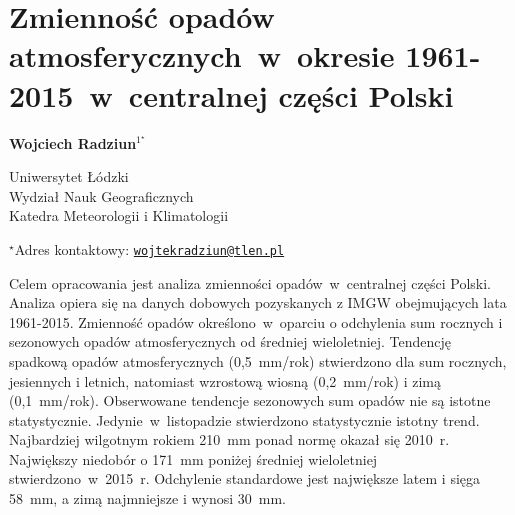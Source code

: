 \documentclass[\main/boa.tex]{subfiles}
\begin{document}
\section{Zmienność opadów atmosferycznych~w~okresie 1961-2015~w~centralnej części Polski}

\begin{center}
  {\bf {} Wojciech Radziun$^{1^\star}$}
\end{center}

\vskip 0.3cm

\begin{affiliations}
\begin{enumerate}
\begin{minipage}{0.915\textwidth}
\centering
\item Uniwersytet Łódzki \\ Wydział Nauk Geograficznych \\ Katedra Meteorologii i Klimatologii\\[-2pt]
\end{minipage}
\end{enumerate}
$^\star$Adres kontaktowy: \href{mailto:wojtekradziun@tlen.pl}{\nolinkurl{wojtekradziun@tlen.pl}}\\
\end{affiliations}

\vskip 0.5cm


\vskip 0.5cm

Celem opracowania jest analiza zmienności opadów~w~centralnej części Polski. Analiza opiera            się na danych dobowych pozyskanych z IMGW obejmujących lata 1961-2015. Zmienność opadów określono~w~oparciu o odchylenia  sum rocznych i sezonowych opadów atmosferycznych od średniej wieloletniej. Tendencję spadkową opadów atmosferycznych (0,5~mm/rok) stwierdzono dla sum rocznych, jesiennych i letnich, natomiast wzrostową wiosną (0,2~mm/rok) i zimą (0,1~mm/rok). Obserwowane tendencje sezonowych sum opadów nie są istotne statystycznie. Jedynie~w~listopadzie stwierdzono statystycznie istotny trend. Najbardziej wilgotnym rokiem 210~mm ponad normę okazał się 2010~r. Największy niedobór o 171~mm poniżej średniej wieloletniej stwierdzono~w~2015~r. Odchylenie standardowe jest największe latem i sięga 58~mm, a zimą najmniejsze i wynosi 30~mm.
\end{document}

